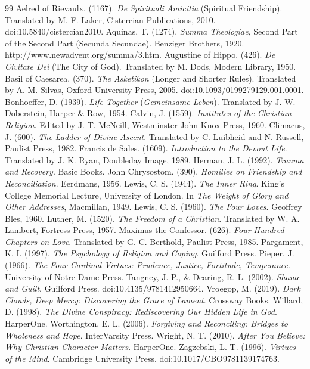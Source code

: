 \documentclass[11pt,twocolumn]{article}
\begin{document}
\begin{thebibliography}{99}
 Aelred of Rievaulx. (1167). \textit{De Spirituali Amicitia} (Spiritual Friendship). Translated by M. F. Laker, Cistercian Publications, 2010. doi:10.5840/cistercian2010.
 Aquinas, T. (1274). \textit{Summa Theologiae}, Second Part of the Second Part (Secunda Secundae). Benziger Brothers, 1920. http://www.newadvent.org/summa/3.htm.
 Augustine of Hippo. (426). \textit{De Civitate Dei} (The City of God). Translated by M. Dods, Modern Library, 1950.
 Basil of Caesarea. (370). \textit{The Asketikon} (Longer and Shorter Rules). Translated by A. M. Silvas, Oxford University Press, 2005. doi:10.1093/0199279129.001.0001.
 Bonhoeffer, D. (1939). \textit{Life Together} (\textit{Gemeinsame Leben}). Translated by J. W. Doberstein, Harper \& Row, 1954.
 Calvin, J. (1559). \textit{Institutes of the Christian Religion}. Edited by J. T. McNeill, Westminster John Knox Press, 1960.
 Climacus, J. (600). \textit{The Ladder of Divine Ascent}. Translated by C. Luibheid and N. Russell, Paulist Press, 1982.
 Francis de Sales. (1609). \textit{Introduction to the Devout Life}. Translated by J. K. Ryan, Doubleday Image, 1989.
 Herman, J. L. (1992). \textit{Trauma and Recovery}. Basic Books.
 John Chrysostom. (390). \textit{Homilies on Friendship and Reconciliation}. Eerdmans, 1956.
 Lewis, C. S. (1944). \textit{The Inner Ring}. King's College Memorial Lecture, University of London. In \textit{The Weight of Glory and Other Addresses}, Macmillan, 1949.
 Lewis, C. S. (1960). \textit{The Four Loves}. Geoffrey Bles, 1960.
 Luther, M. (1520). \textit{The Freedom of a Christian}. Translated by W. A. Lambert, Fortress Press, 1957.
 Maximus the Confessor. (626). \textit{Four Hundred Chapters on Love}. Translated by G. C. Berthold, Paulist Press, 1985.
 Pargament, K. I. (1997). \textit{The Psychology of Religion and Coping}. Guilford Press.
 Pieper, J. (1966). \textit{The Four Cardinal Virtues: Prudence, Justice, Fortitude, Temperance}. University of Notre Dame Press.
 Tangney, J. P., \& Dearing, R. L. (2002). \textit{Shame and Guilt}. Guilford Press. doi:10.4135/9781412950664.
 Vroegop, M. (2019). \textit{Dark Clouds, Deep Mercy: Discovering the Grace of Lament}. Crossway Books.
 Willard, D. (1998). \textit{The Divine Conspiracy: Rediscovering Our Hidden Life in God}. HarperOne.
 Worthington, E. L. (2006). \textit{Forgiving and Reconciling: Bridges to Wholeness and Hope}. InterVarsity Press.
 Wright, N. T. (2010). \textit{After You Believe: Why Christian Character Matters}. HarperOne.
 Zagzebski, L. T. (1996). \textit{Virtues of the Mind}. Cambridge University Press. doi:10.1017/CBO9781139174763.
\end{thebibliography}
\end{document}
